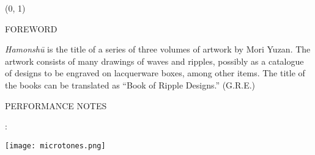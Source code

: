 \documentclass[11pt]{article}
\begin{document}
\begin{textblock}{23}(0, 1)
\begin{center}
\huge FOREWORD
\end{center}
\end{textblock}

\vspace*{0.25\baselineskip}

\begingroup
\begin{center}
\textit{Hamonsh\=u} is the title of a series of three volumes of artwork by Mori Yuzan. The artwork consists of many drawings of waves and ripples, possibly as a catalogue of designs to be engraved on lacquerware boxes, among other items. The title of the books can be translated as ``Book of Ripple Designs.''
\rightskip\leftskip
\phantom{text} \hfill (G.R.E.)
\end{center}
\endgroup

\begin{center}
\huge PERFORMANCE NOTES
\end{center}

\begin{center}
:
\end{center}

\begin{center}
\texttt{[image: microtones.png]}
\end{center}
\end{document}
